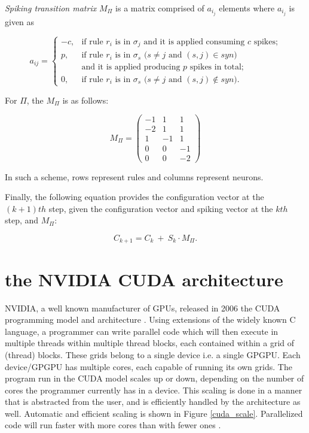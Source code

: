 \documentclass{acm_proc_article-sp}
\begin{document}
\textit{Spiking transition matrix} $M_{\Pi}$ is a matrix comprised of $a_i_j$
elements where $a_i_j$ is given as

\begin{definition}\label{defi-snp-mat}
$$
a_{ij} = \left\{
\begin{array}{rl}
-c, &\mbox{if rule $r_i$ is in $\sigma_j$ and it is applied consuming $c$ spikes;} \\
 p, &\mbox{if rule $r_i$ is in $\sigma_s$ ($s\neq j$ and $(s,j)\in syn$)} \\
 & \mbox{and it is applied producing $p$ spikes in total;}\\
 0, &\mbox{if rule $r_i$ is in $\sigma_s$ ($s\neq j$ and $(s,j)\notin syn$).}
    \end{array}
\right.
$$
\end{definition}

For $\Pi$, the $M_{\Pi}$ is as follows:

\begin{equation}\label{snp_mat}
M_{\Pi} = \left(
\begin{array}{ccc}
  -1 & 1 & 1\\
  -2 & 1 &  1 \\
   1 &  -1 & 1 \\
   0 & 0 & -1\\
   0 & 0& -2
\end{array}\right)
\end{equation}

In such a scheme, rows represent rules and columns
represent neurons.

Finally, the following equation provides the configuration
vector at the $(k+1)th$ step, given the configuration vector and
spiking vector at the $kth$ step, and $M_{\Pi}$:

\begin{equation}\label{next-config}
C_{k+1} =  C_{k} ~ + ~ S_{k}\cdot M_{\Pi}.
\end{equation}


\section{the NVIDIA CUDA architecture}

NVIDIA, a well known manufacturer of GPUs, released in
2006 the CUDA programming model and architecture \cite{cudapage}.
Using extensions of the widely known C language, a
programmer can write parallel code which will then execute
in multiple threads within multiple thread blocks, each
contained within a grid of (thread) blocks. These grids
belong to a single device i.e. a single GPGPU. Each
device/GPGPU has multiple cores, each capable of running
its own grids. The program run in the CUDA model scales
up or down, depending on the number of cores the
programmer currently has in a device. This scaling is done
in a manner that is abstracted from the user, and is
efficiently handled by the architecture as well. Automatic and efficient scaling is shown
in Figure \ref{cuda_scale}. Parallelized code will run faster with more cores
than with fewer ones \cite{cudaguide}.
\end{document}
